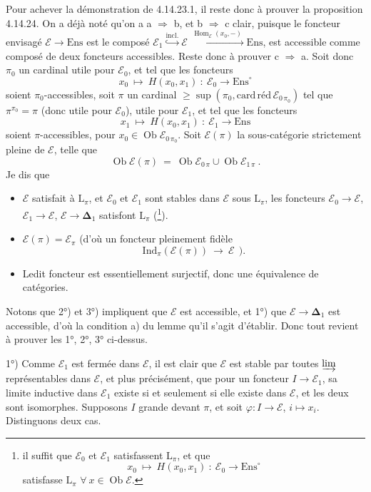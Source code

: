 \documentclass[11pt]{article}
\newcommand{\printedpage}[1]{\marginpar{\footnotesize p.~#1}}
\newcommand{\msp}[1]{\marginpar{\footnotesize [#1]}}
\newcommand{\Ob}{\operatorname{Ob}}
\newcommand{\Hom}{\operatorname{Hom}}
\newcommand{\Ens}{\mathrm{Ens}}
\newcommand{\bDelta}{\boldsymbol{\Delta}}
\begin{document}
Pour achever la démonstration de 4.14.23.1, il reste donc à prouver la proposition 4.14.24. On a déjà noté qu'on a a $\Longrightarrow$ b, et b $\Longrightarrow$ c clair, puisque le foncteur envisagé $\mathcal{E}\longrightarrow\Ens$ est le composé $\mathcal{E}_1\overset{\text{incl.}}{\hookrightarrow}\mathcal{E}\xrightarrow{\;\Hom_{\mathcal{E}}(x_0,-)\;}\Ens$, est accessible comme composé de deux
\msp{page 415}
foncteurs accessibles. Reste donc à prouver c $\Longrightarrow$ a. Soit donc $\pi_0$ un cardinal utile pour $\mathcal{E}_0$, et tel que les foncteurs
\[
x_0\ \longmapsto\ H(x_0,x_1)\ :\ \mathcal{E}_0\longrightarrow\Ens^{\circ}
\]
soient $\pi_0$-accessibles, soit $\pi$ un cardinal $\geqslant\sup(\pi_0,\mathrm{card}\,\text{réd}\,\mathcal{E}_{0\,\pi_0})$ tel que $\pi^{\pi_0}=\pi$ (donc utile pour $\mathcal{E}_0$), utile pour $\mathcal{E}_1$, et tel que les foncteurs
\[
x_1\ \longmapsto\ H(x_0,x_1)\ :\ \mathcal{E}_1\longrightarrow\Ens
\]
soient $\pi$-accessibles, pour $x_0\in\Ob\mathcal{E}_{0\,\pi_0}$. Soit $\mathcal{E}(\pi)$ la sous-catégorie strictement pleine de $\mathcal{E}$, telle que
\[
\Ob\mathcal{E}(\pi)\ =\ \Ob\mathcal{E}_{0\,\pi}\cup\Ob\mathcal{E}_{1\,\pi}\ .
\]
Je dis que
\begin{itemize}[leftmargin=*]
\item[1°)] $\mathcal{E}$ satisfait à $\mathrm{L}_\pi$, et $\mathcal{E}_0$ et $\mathcal{E}_1$ sont stables dans $\mathcal{E}$ sous $\mathrm{L}_\pi$, les foncteurs $\mathcal{E}_0\longrightarrow\mathcal{E}$, $\mathcal{E}_1\longrightarrow\mathcal{E}$, $\mathcal{E}\longrightarrow\bDelta_1$ satisfont $\mathrm{L}_\pi$ (\footnote[174]{il suffit que $\mathcal{E}_0$ et $\mathcal{E}_1$ satisfassent $\mathrm{L}_\pi$, et que
\[
x_0\ \longmapsto\ H(x_0,x_1)\ :\ \mathcal{E}_0\longrightarrow\Ens^{\circ}
\]
satisfasse $\mathrm{L}_\pi$ $\forall\ x\in\Ob\mathcal{E}$.}).
\item[2°)] $\mathcal{E}(\pi)=\mathcal{E}_\pi$ (d'où un foncteur pleinement fidèle
\[
\mathrm{Ind}_\pi(\mathcal{E}(\pi))\ \longrightarrow\ \mathcal{E}\ \ ).
\]
\item[3°)] Ledit foncteur est essentiellement surjectif,
\msp{page 416}
donc une équivalence de catégories.
\end{itemize}
Notons que 2°) et 3°) impliquent que $\mathcal{E}$ est accessible, et 1°) que $\mathcal{E}\longrightarrow\bDelta_1$ est accessible, d'où la condition a) du lemme qu'il s'agit d'établir. Donc tout revient à prouver les 1°, 2°, 3° ci-dessus.

\printedpage{158}
1°) Comme $\mathcal{E}_1$ est fermée dans $\mathcal{E}$, il est clair que $\mathcal{E}$ est stable par toutes $\varinjlim$ représentables dans $\mathcal{E}$, et plus précisément, que pour un foncteur $I\longrightarrow\mathcal{E}_1$, sa limite inductive dans $\mathcal{E}_1$ existe si et seulement si elle existe dans $\mathcal{E}$, et les deux sont isomorphes. Supposons $I$ grande devant $\pi$, et soit $\varphi:I\longrightarrow\mathcal{E}$, $i\longmapsto x_i$. Distinguons deux cas.
\end{document}
